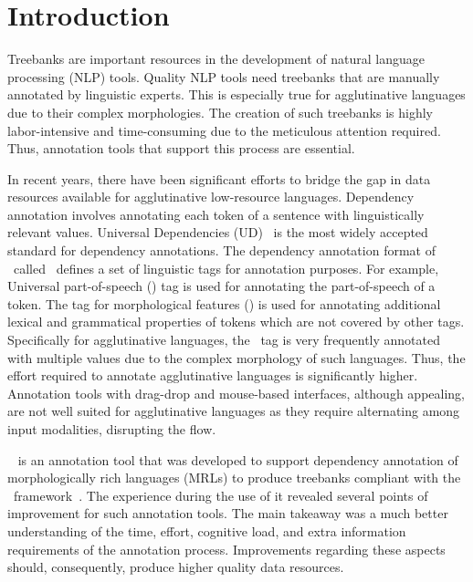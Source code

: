 \section{Introduction}
\label{sec:introduction}

Treebanks are important resources in the development of natural language processing (NLP) tools.
Quality NLP tools need treebanks that are manually annotated by linguistic experts.
This is especially true for agglutinative languages due to their complex morphologies.
The creation of such treebanks is highly labor-intensive and time-consuming due to the meticulous attention required.
Thus, annotation tools that support this process are essential.

In recent years, there have been significant efforts to bridge the gap in data resources available for agglutinative low-resource languages.
Dependency annotation involves annotating each token of a sentence with linguistically relevant values.
Universal Dependencies (UD)~\cite{UD} is the most widely accepted standard for dependency annotations.
The dependency annotation format of \ud\ called \conll\ defines a set of linguistic tags for annotation purposes.
For example, Universal part-of-speech (\upos) tag is used for annotating the part-of-speech of a token.
The tag for morphological features (\feats) is used for annotating additional lexical and grammatical properties of tokens which are not covered by other tags.
Specifically for agglutinative languages, the \feats\ tag is very frequently annotated with multiple values due to the complex morphology of such languages.
Thus, the effort required to annotate agglutinative languages is significantly higher.
Annotation tools with drag-drop and mouse-based interfaces, although appealing, are not well suited for agglutinative languages as they require alternating among input modalities, disrupting the flow.

\boatvone~\cite{turk2021resources} is an annotation tool that was developed to support dependency annotation of morphologically rich languages (MRLs) to produce treebanks compliant with the \ud\ framework~\cite{UD}.
The experience during the use of it revealed several points of improvement for such annotation tools.
The main takeaway was a much better understanding of the time, effort, cognitive load, and extra information requirements of the annotation process.
Improvements regarding these aspects should, consequently, produce higher quality data resources.

